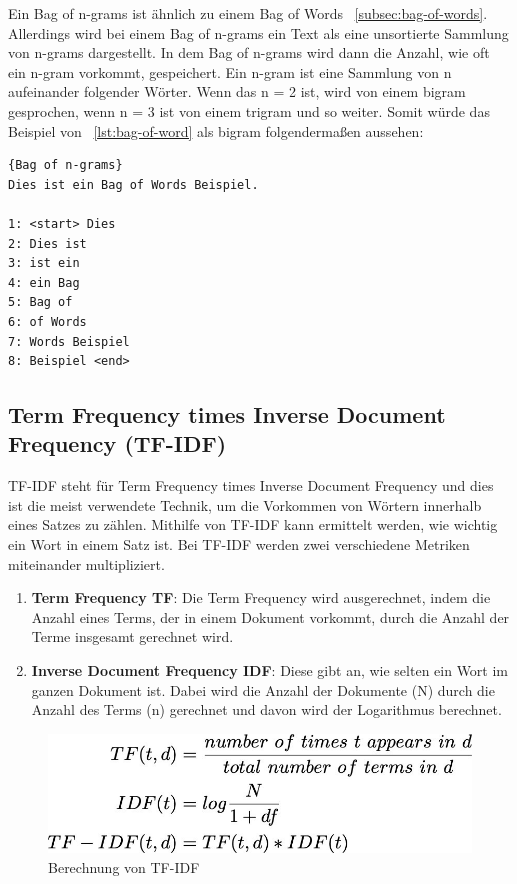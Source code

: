 Ein Bag of n-grams ist ähnlich zu einem Bag of Words ~\ref{subsec:bag-of-words}.
Allerdings wird bei einem Bag of n-grams ein Text als eine unsortierte Sammlung von n-grams dargestellt.
In dem Bag of n-grams wird dann die Anzahl, wie oft ein n-gram vorkommt, gespeichert.
Ein n-gram ist eine Sammlung von n aufeinander folgender Wörter.
Wenn das n = 2 ist, wird von einem bigram gesprochen, wenn n = 3 ist von einem trigram und so weiter.
Somit würde das Beispiel von ~\ref{lst:bag-of-word} als bigram folgendermaßen aussehen:

\begin{lstlisting}[label={lst:bag-of-n-grams},caption={Bag of n-grams}]{Bag of n-grams}
Dies ist ein Bag of Words Beispiel.

1: <start> Dies
2: Dies ist
3: ist ein
4: ein Bag
5: Bag of
6: of Words
7: Words Beispiel
8: Beispiel <end>
\end{lstlisting}

\subsection{Term Frequency times Inverse Document Frequency (TF-IDF)}\label{subsec:tf-idf}

TF-IDF steht für Term Frequency times Inverse Document Frequency und dies ist die meist verwendete Technik, um die Vorkommen von Wörtern innerhalb eines Satzes zu zählen.
Mithilfe von TF-IDF kann ermittelt werden, wie wichtig ein Wort in einem Satz ist.
Bei TF-IDF werden zwei verschiedene Metriken miteinander multipliziert.\cite{tfIdf}

\begin{enumerate}
    \item \textbf{Term Frequency TF}: Die Term Frequency wird ausgerechnet, indem die Anzahl eines Terms, der in einem Dokument vorkommt, durch die Anzahl der Terme insgesamt gerechnet wird.
    \item \textbf{Inverse Document Frequency IDF}: Diese gibt an, wie selten ein Wort im ganzen Dokument ist.
    Dabei wird die Anzahl der Dokumente (N) durch die Anzahl des Terms (n) gerechnet und davon wird der Logarithmus berechnet.
\end{enumerate}

\begin{figure}[hbt!]
    \centering
    \includegraphics[scale=0.35]{pics/tf_idf}
    \caption{Berechnung von TF-IDF~\cite{tfIdfImage}}
    \label{fig:tf-idf}
\end{figure}

